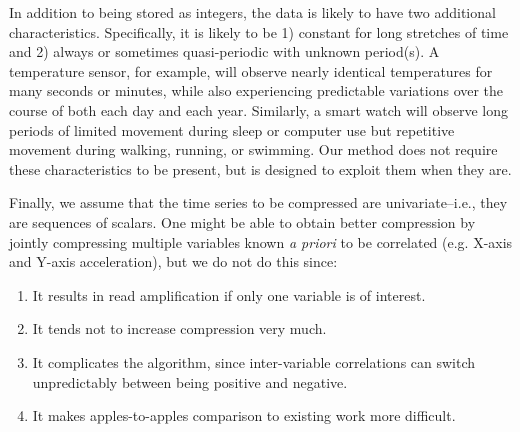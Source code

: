 In addition to being stored as integers, the data is likely to have two additional characteristics. Specifically, it is likely to be 1) constant for long stretches of time and 2) always or sometimes quasi-periodic with unknown period(s). A temperature sensor, for example, will observe nearly identical temperatures for many seconds or minutes, while also experiencing predictable variations over the course of both each day and each year. Similarly, a smart watch will observe long periods of limited movement during sleep or computer use but repetitive movement during walking, running, or swimming. Our method does not require these characteristics to be present, but is designed to exploit them when they are.

Finally, we assume that the time series to be compressed are univariate--i.e., they are sequences of scalars. One might be able to obtain better compression by jointly compressing multiple variables known \textit{a priori} to be correlated (e.g. X-axis and Y-axis acceleration), but we do not do this since:

\begin{enumerate}[leftmargin=4mm]
\item It results in read amplification if only one variable is of interest.
\item It tends not to increase compression very much.
\item It complicates the algorithm, since inter-variable correlations can switch unpredictably between being positive and negative.
\item It makes apples-to-apples comparison to existing work more difficult.
\end{enumerate}




